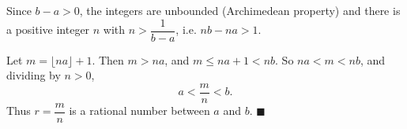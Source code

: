 Since $b-a>0$, the integers are unbounded (Archimedean property) and there is a positive integer $n$ with $n>\dfrac{1}{b-a}$, i.e. $nb-na>1$.

Let $m=\lfloor na\rfloor+1$. Then $m>na$, and $m\le na+1<nb$. So $na<m<nb$, and dividing by $n>0$,
\[a<\dfrac mn<b.\]
Thus $r=\dfrac mn$ is a rational number between $a$ and $b$. $\blacksquare$

